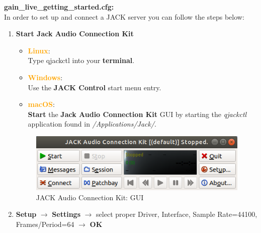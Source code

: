 \documentclass[11pt,a4paper,twoside]{article}
\newcommand{\+}{\discretionary{\mbox{\scriptsize$\hookleftarrow$}}{}{}}
\begin{document}
{{\textbf{gain\_live\_getting\_started.cfg:} \\





In order to set up and connect a JACK server you can follow the steps below:

\begin{enumerate}
    \item \textbf{Start Jack Audio Connection Kit} 
    
    \begin{itemize}
\item \textcolor{orange}{\textbf{Linux}}: \\ Type {\ttfamily qjackctl} into your \textbf{terminal}. 
\item \textcolor{orange}{\textbf{Windows}}: \\ Use the \textbf{JACK Control} start menu entry.
\item \textcolor{orange}{\textbf{macOS}}: \\ \textbf{Start} the \textbf{Jack Audio Connection Kit} GUI by starting the \textit{qjackctl} application found in \textit{/Applications/Jack/}.
\end{itemize}

\begin{figure}[H]
\centering
\includegraphics[scale=0.4]{jack_gui.png}
\caption{JACK Audio Connection Kit: GUI}
\end{figure}
      
    \item \textbf{Setup} $\rightarrow$ \textbf{Settings} $\rightarrow$ select proper Driver, Interface, Sample Rate=44100, \\Frames/Period=64 $\rightarrow$ \textbf{OK} 
    

\end{enumerate}}}
\end{document}
